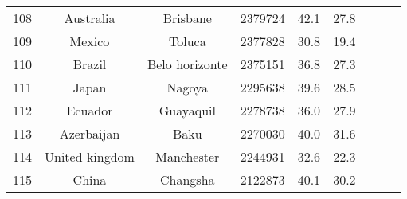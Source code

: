 \begin{table}
\begin{tabular}{ccccccccc}
 108 &           Australia &        Brisbane &    2379724 &     42.1 &     27.8 \\
 109 &              Mexico &          Toluca &    2377828 &     30.8 &     19.4 \\
 110 &              Brazil &  Belo horizonte &    2375151 &     36.8 &     27.3 \\
 111 &               Japan &          Nagoya &    2295638 &     39.6 &     28.5 \\
 112 &             Ecuador &       Guayaquil &    2278738 &     36.0 &     27.9 \\
 113 &          Azerbaijan &            Baku &    2270030 &     40.0 &     31.6 \\
 114 &      United kingdom &      Manchester &    2244931 &     32.6 &     22.3 \\
 115 &               China &        Changsha &    2122873 &     40.1 &     30.2 \\
\bottomrule
\end{tabular}
\end{table}
